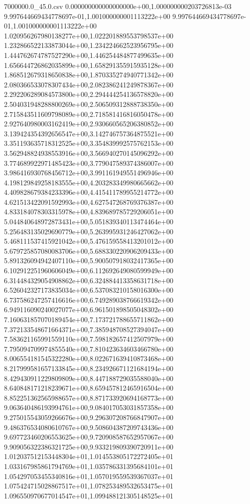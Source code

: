 \begin{filecontents*}{7000000.0_45.0.csv}
0.000000000000000000e+00,1.000000000203726813e-03
9.997644669434778697e-01,1.001000000001113222e+00
9.997644669434778697e-01,1.001000000001113222e+00
1.020956267980138277e+00,1.022201889553798537e+00
1.232866522133873044e+00,1.234224662523956795e+00
1.444762674787527290e+00,1.446254484877499635e+00
1.656644726862035899e+00,1.658291355915935128e+00
1.868512679318650838e+00,1.870335274940771342e+00
2.080366533078307434e+00,2.082386241249878367e+00
2.292206289084573800e+00,2.294444254136578820e+00
2.504031948288800269e+00,2.506509312888738350e+00
2.715843511609798089e+00,2.718581416816050478e+00
2.927640980003162419e+00,2.930660565206380852e+00
3.139424354392656547e+00,3.142746757364875521e+00
3.351193635718312525e+00,3.354839992575762153e+00
3.562948824938553916e+00,3.566940270145096292e+00
3.774689922971485423e+00,3.779047589374386007e+00
3.986416930768456712e+00,3.991161949551496946e+00
4.198129849258183555e+00,4.203283349980665662e+00
4.409828679384233396e+00,4.415411789955214772e+00
4.621513422091592993e+00,4.627547268769376387e+00
4.833184078303315978e+00,4.839689785729206051e+00
5.044840648972873431e+00,5.051839340113474464e+00
5.256483135029690779e+00,5.263995931246427062e+00
5.468111537415921042e+00,5.476159558413201012e+00
5.679725857080083706e+00,5.688330220906209433e+00
5.891326094942407110e+00,5.900507918032417365e+00
6.102912251960606049e+00,6.112692649080599949e+00
6.314484329054908862e+00,6.324884413358631718e+00
6.526042327173835034e+00,6.537083210158016300e+00
6.737586247257416616e+00,6.749289038766619342e+00
6.949116090240027077e+00,6.961501898505048302e+00
7.160631857070189454e+00,7.173721788655711862e+00
7.372133548671664371e+00,7.385948708527394047e+00
7.583621165991559110e+00,7.598182657412507979e+00
7.795094709974855540e+00,7.810423634603466780e+00
8.006554181545322280e+00,8.022671639410873468e+00
8.217999581657133845e+00,8.234926671121684194e+00
8.429430911229809809e+00,8.447188729035588040e+00
8.640848171218239671e+00,8.659457812465916504e+00
8.852251362565988657e+00,8.871733920694168773e+00
9.063640486193994761e+00,9.084017053031857358e+00
9.275015543059266676e+00,9.296307208766847907e+00
9.486376534080610767e+00,9.508604387209743436e+00
9.697723460206553625e+00,9.720908587652957067e+00
9.909056322386321725e+00,9.933219809390720911e+00
1.012037512153448304e+01,1.014553805172272405e+01
1.033167985861794769e+01,1.035786331395684101e+01
1.054297053455340816e+01,1.057019559539367037e+01
1.075424715028867517e+01,1.078253489532653475e+01
1.096550970677014547e+01,1.099488121305148525e+01

\end{filecontents*}
